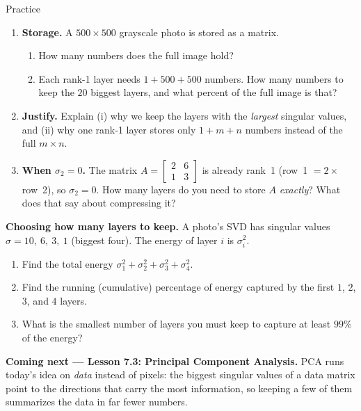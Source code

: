 \documentclass[10pt]{article}
\begin{document}
\begin{notesbox}{Practice}
\begin{enumerate}[leftmargin=1.9em, itemsep=12pt]
\begin{enumerate}[label=(\alph*), leftmargin=1.8em, itemsep=3pt]
      \item Write the rank-1 approximation $A_1$, and find what fraction of the energy $\sigma_1^2+\sigma_2^2$ it keeps.
    \end{enumerate}
    \vspace{2.4cm}
  \item \textbf{Storage.} A $500\times500$ grayscale photo is stored as a matrix.
    \begin{enumerate}[label=(\alph*), leftmargin=1.8em, itemsep=3pt]
      \item How many numbers does the full image hold?
      \item Each rank-1 layer needs $1+500+500$ numbers. How many numbers to keep the $20$ biggest layers, and what percent of the full image is that?
    \end{enumerate}
    \vspace{1.6cm}
  \item \textbf{Justify.} Explain (i) why we keep the layers with the \emph{largest} singular values, and (ii) why one rank-1 layer stores only $1+m+n$ numbers instead of the full $m\times n$. 
  \item \textbf{When $\sigma_2=0$.} The matrix $A=\begin{bmatrix} 2 & 6\\ 1 & 3 \end{bmatrix}$ is already rank~1 (row~1 $=2\times$ row~2), so $\sigma_2=0$. How many layers do you need to store $A$ \emph{exactly}? What does that say about compressing it? 
\end{enumerate}
\end{notesbox}

\begin{extensionbox}
\textbf{Choosing how many layers to keep.} A photo's SVD has singular values
$\sigma=10,\ 6,\ 3,\ 1$ (biggest four). The energy of layer $i$ is $\sigma_i^2$.
\begin{enumerate}[label=(\alph*), leftmargin=1.8em, itemsep=4pt]
  \item Find the total energy $\sigma_1^2+\sigma_2^2+\sigma_3^2+\sigma_4^2$.
  \item Find the running (cumulative) percentage of energy captured by the first $1$, $2$, $3$, and $4$ layers.
  \item What is the smallest number of layers you must keep to capture at least $99\%$ of the energy?
\end{enumerate}
\end{extensionbox}

\begin{spiralbox}
\textbf{Coming next --- Lesson 7.3: Principal Component Analysis.} PCA runs today's idea on \emph{data}
instead of pixels: the biggest singular values of a data matrix point to the directions that carry the
most information, so keeping a few of them summarizes the data in far fewer numbers.
\end{spiralbox}
\end{document}

